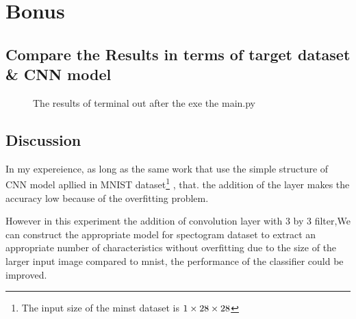 \section{Bonus}
\subsection{Compare the Results in terms of target dataset \& CNN model}
\vspace{-4mm}
\begin{figure}[h!]
\centering
{}
\hfill
{}
\caption{The results of terminal out after the exe the main.py}
\end{figure}

\subsection{Discussion}
In my expereience, as long as the same work that use the simple structure of CNN model apllied in MNIST dataset\footnote{The input size of the minst dataset is $\small 1 \times 28 \times 28$} , that. the addition of the layer makes the accuracy low because of the overfitting problem.

However in this experiment the addition of convolution layer with 3 by 3 filter,We can construct the appropriate model for spectogram dataset to extract an appropriate number of characteristics without overfitting due to the size of the larger input image compared to mnist, the performance of the classifier could be improved.